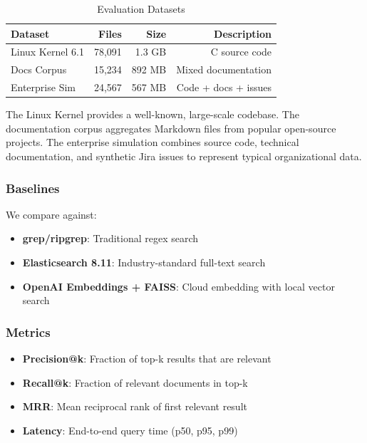 \documentclass[conference]{IEEEtran}
\begin{document}
\begin{table}[htbp]
\caption{Evaluation Datasets}
\begin{center}
\begin{tabular}{lrrr}
\toprule
\textbf{Dataset} & \textbf{Files} & \textbf{Size} & \textbf{Description} \\
\midrule
Linux Kernel 6.1 & 78,091 & 1.3 GB & C source code \\
Docs Corpus & 15,234 & 892 MB & Mixed documentation \\
Enterprise Sim & 24,567 & 567 MB & Code + docs + issues \\
\bottomrule
\end{tabular}
\label{tab:datasets}
\end{center}
\end{table}

The Linux Kernel provides a well-known, large-scale codebase. The documentation corpus aggregates Markdown files from popular open-source projects. The enterprise simulation combines source code, technical documentation, and synthetic Jira issues to represent typical organizational data.

\subsubsection{Baselines}

We compare against:
\begin{itemize}
    \item \textbf{grep/ripgrep}: Traditional regex search
    \item \textbf{Elasticsearch 8.11}: Industry-standard full-text search
    \item \textbf{OpenAI Embeddings + FAISS}: Cloud embedding with local vector search
\end{itemize}

\subsubsection{Metrics}

\begin{itemize}
    \item \textbf{Precision@k}: Fraction of top-k results that are relevant
    \item \textbf{Recall@k}: Fraction of relevant documents in top-k
    \item \textbf{MRR}: Mean reciprocal rank of first relevant result
    \item \textbf{Latency}: End-to-end query time (p50, p95, p99)
\end{itemize}
\end{document}
